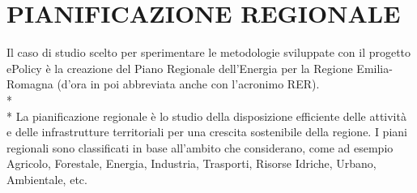 \documentclass[12pt,a4paper,openright,twoside]{report}
\begin{document}
\section{PIANIFICAZIONE REGIONALE}

Il caso di studio scelto per sperimentare le metodologie sviluppate con il progetto ePolicy è la creazione del Piano Regionale dell'Energia per la Regione Emilia-Romagna (d'ora in poi abbreviata anche con l'acronimo RER).\\*\\*
La pianificazione regionale è lo studio della disposizione efficiente delle attività e delle infrastrutture territoriali per una crescita sostenibile della regione. I piani regionali sono classificati in base all'ambito che considerano, come ad esempio Agricolo, Forestale, Energia, Industria, Trasporti, Risorse Idriche, Urbano, Ambientale, etc.
\end{document}

